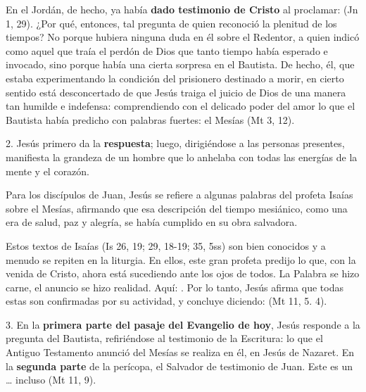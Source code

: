 En el Jordán, de hecho, ya había \textbf{dado testimonio de Cristo} al proclamar:  (Jn 1, 29). ¿Por qué, entonces, tal pregunta de quien reconoció la plenitud de los tiempos? No porque hubiera ninguna duda en él sobre el Redentor, a quien indicó como aquel que traía el perdón de Dios que tanto tiempo había esperado e invocado, sino porque había una cierta sorpresa en el Bautista. De hecho, él, que estaba experimentando la condición del prisionero destinado a morir, en cierto sentido está desconcertado de que Jesús traiga el juicio de Dios de una manera tan humilde e indefensa: comprendiendo con el delicado poder del amor lo que el Bautista había predicho con palabras fuertes: el Mesías  (Mt 3, 12).

2. Jesús primero da la \textbf{respuesta}; luego, dirigiéndose a las personas presentes, manifiesta la grandeza de un hombre que lo anhelaba con todas las energías de la mente y el corazón.

Para los discípulos de Juan, Jesús se refiere a algunas palabras del profeta Isaías sobre el Mesías, afirmando que esa descripción del tiempo mesiánico, como una era de salud, paz y alegría, se había cumplido en su obra salvadora.

Estos textos de Isaías (Is 26, 19; 29, 18-19; 35, 5ss) son bien conocidos y a menudo se repiten en la liturgia. En ellos, este gran profeta predijo lo que, con la venida de Cristo, ahora está sucediendo ante los ojos de todos. La Palabra se hizo carne, el anuncio se hizo realidad. Aquí: . Por lo tanto, Jesús afirma que todas estas  son confirmadas por su actividad, y concluye diciendo:  (Mt 11, 5. 4).

3. En la \textbf{primera parte del pasaje del Evangelio de hoy}, Jesús responde a la pregunta del Bautista, refiriéndose al testimonio de la Escritura: lo que el Antiguo Testamento anunció del Mesías se realiza en él, en Jesús de Nazaret. En la \textbf{segunda parte} de la perícopa, el Salvador de testimonio de Juan. Este es un  \ldots{} incluso  (Mt 11, 9).

